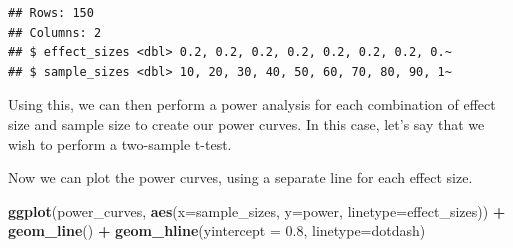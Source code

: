 \documentclass[
  12pt,
]{book}
\newenvironment{Shaded}{\begin{snugshade}}{\end{snugshade}}
\newcommand{\AttributeTok}[1]{\textcolor[rgb]{0.13,0.29,0.53}{#1}}
\newcommand{\CommentTok}[1]{\textcolor[rgb]{0.56,0.35,0.01}{\textit{#1}}}
\newcommand{\ControlFlowTok}[1]{\textcolor[rgb]{0.13,0.29,0.53}{\textbf{#1}}}
\newcommand{\FloatTok}[1]{\textcolor[rgb]{0.00,0.00,0.81}{#1}}
\newcommand{\FunctionTok}[1]{\textcolor[rgb]{0.13,0.29,0.53}{\textbf{#1}}}
\newcommand{\NormalTok}[1]{#1}
\newcommand{\OtherTok}[1]{\textcolor[rgb]{0.56,0.35,0.01}{#1}}
\newcommand{\SpecialCharTok}[1]{\textcolor[rgb]{0.81,0.36,0.00}{\textbf{#1}}}
\newcommand{\StringTok}[1]{\textcolor[rgb]{0.31,0.60,0.02}{#1}}
\begin{document}
\begin{verbatim}
## Rows: 150
## Columns: 2
## $ effect_sizes <dbl> 0.2, 0.2, 0.2, 0.2, 0.2, 0.2, 0.2, 0.~
## $ sample_sizes <dbl> 10, 20, 30, 40, 50, 60, 70, 80, 90, 1~
\end{verbatim}

Using this, we can then perform a power analysis for each combination of effect size and sample size to create our power curves. In this case, let's say that we wish to perform a two-sample t-test.

\begin{Shaded}
\end{Shaded}

Now we can plot the power curves, using a separate line for each effect size.

\begin{Shaded}
\begin{Highlighting}[]
\FunctionTok{ggplot}\NormalTok{(power\_curves, }
       \FunctionTok{aes}\NormalTok{(}\AttributeTok{x=}\NormalTok{sample\_sizes,}
           \AttributeTok{y=}\NormalTok{power, }
           \AttributeTok{linetype=}\NormalTok{effect\_sizes)) }\SpecialCharTok{+} 
  \FunctionTok{geom\_line}\NormalTok{() }\SpecialCharTok{+} 
  \FunctionTok{geom\_hline}\NormalTok{(}\AttributeTok{yintercept =} \FloatTok{0.8}\NormalTok{, }
             \AttributeTok{linetype=}\StringTok{\textquotesingle{}dotdash\textquotesingle{}}\NormalTok{)}
\end{Highlighting}
\end{Shaded}
\end{document}
